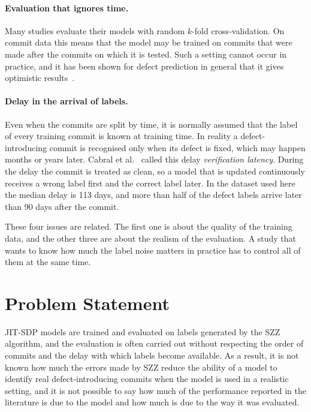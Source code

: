 \documentclass[12pt,a4paper,oneside]{report}
\begin{document}
\paragraph{Evaluation that ignores time.} Many studies evaluate their models
with random $k$-fold cross-validation. On commit data this means that the
model may be trained on commits that were made after the commits on which it
is tested. Such a setting cannot occur in practice, and it has been shown for
defect prediction in general that it gives optimistic
results~\cite{falessi2020order,tan2015online}.

\paragraph{Delay in the arrival of labels.} Even when the commits are split
by time, it is normally assumed that the label of every training commit is
known at training time. In reality a defect-introducing commit is recognised
only when its defect is fixed, which may happen months or years later. Cabral
et al.~\cite{cabral2019orb} called this delay \emph{verification latency}.
During the delay the commit is treated as clean, so a model that is updated
continuously receives a wrong label first and the correct label later. In the
dataset used here the median delay is 113 days, and more than half of the
defect labels arrive later than 90 days after the commit.

These four issues are related. The first one is about the quality of the
training data, and the other three are about the realism of the evaluation.
A study that wants to know how much the label noise matters in practice has to
control all of them at the same time.

\section{Problem Statement}

JIT-SDP models are trained and evaluated on labels generated by the SZZ
algorithm, and the evaluation is often carried out without respecting the
order of commits and the delay with which labels become available. As a
result, it is not known how much the errors made by SZZ reduce the ability of
a model to identify real defect-introducing commits when the model is used in
a realistic setting, and it is not possible to say how much of the performance
reported in the literature is due to the model and how much is due to the way
it was evaluated.
\end{document}
